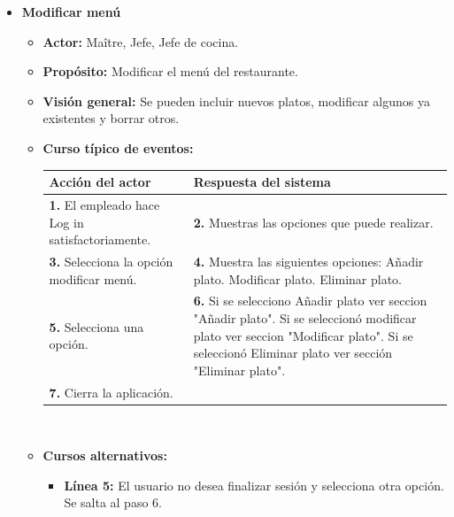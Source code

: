 \documentclass[spanish,a4paper,12pt]{report}		%
\begin{document}
\begin{itemize}

		\item \textbf{Modificar menú}
			\begin{itemize}
			\item \textbf{Actor:} Maître, Jefe, Jefe de cocina.
			\item \textbf{Propósito: } Modificar el menú del restaurante.
			\item \textbf{Visión general:} Se pueden incluir nuevos platos, modificar algunos ya existentes y borrar otros.
	\newpage
			\item \textbf{Curso típico de eventos:} 	\\
				\begin{tabular}{|p{6cm}||p{6cm}|}
				\hline
				\textbf{Acción del actor} & \textbf{Respuesta del sistema} \\ \hline \hline
				\textbf{1.}    El empleado hace Log in satisfactoriamente. & \textbf{2.} Muestras las opciones que puede realizar. \\ \hline
				\textbf{3.} Selecciona la opción modificar menú. & \textbf{4.} Muestra las siguientes opciones: Añadir plato. Modificar plato. Eliminar plato. \\ \hline
				\textbf{5.} Selecciona una opción.	& \textbf{6.} Si se selecciono Añadir plato ver seccion "Añadir plato". Si se seleccionó modificar plato ver seccion "Modificar plato". Si se seleccionó Eliminar plato ver sección "Eliminar plato". \\ \hline
				\textbf{7.} Cierra la aplicación. &  \\ \hline
			\end{tabular}
			\\
			\item \textbf{Cursos alternativos:} 
			\begin{itemize}
			\item  \textbf{Línea 5:} El usuario no desea finalizar sesión y selecciona otra opción. Se salta al paso 6.
			\end {itemize}
			

\end{itemize}
\end{itemize}
\end{document}
